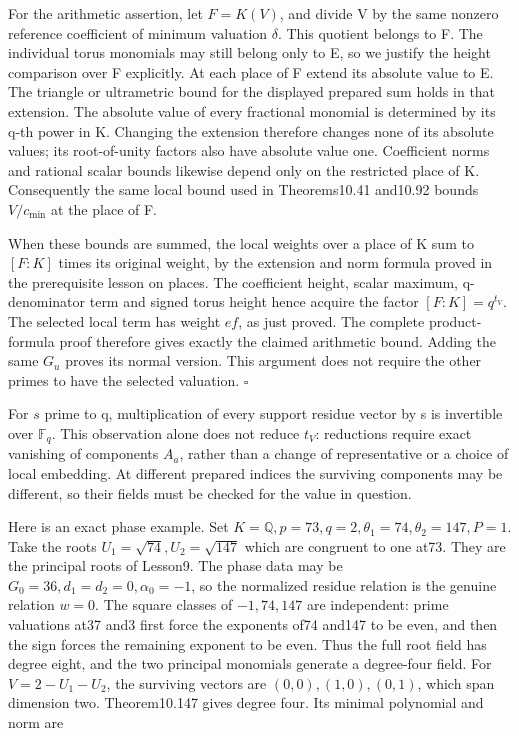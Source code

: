 \documentclass[
  11pt,
  a4paper,
]{article}
\newcounter{none} %
\begin{document}
For the arithmetic assertion, let \(F=K(V)\), and divide V by the same
nonzero reference coefficient of minimum valuation \(\delta\). This
quotient belongs to F. The individual torus monomials may still belong
only to E, so we justify the height comparison over F explicitly. At
each place of F extend its absolute value to E. The triangle or
ultrametric bound for the displayed prepared sum holds in that
extension. The absolute value of every fractional monomial is determined
by its q-th power in K. Changing the extension therefore changes none of
its absolute values; its root-of-unity factors also have absolute value
one. Coefficient norms and rational scalar bounds likewise depend only
on the restricted place of K. Consequently the same local bound used in
Theorems10.41 and10.92 bounds \(V/c_{\min}\) at the place of F.

When these bounds are summed, the local weights over a place of K sum to
\([F:K]\) times its original weight, by the extension and norm formula
proved in the prerequisite lesson on places. The coefficient height,
scalar maximum, q-denominator term and signed torus height hence acquire
the factor \([F:K]=q^{t_V}\). The selected local term has weight \(ef\),
as just proved. The complete product-formula proof therefore gives
exactly the claimed arithmetic bound. Adding the same \(G_u\) proves its
normal version. This argument does not require the other primes to have
the selected valuation. \(\square\)

For \(s\) prime to q, multiplication of every support residue vector by
s is invertible over \(\mathbb F_q\). This observation alone does not
reduce \(t_V\): reductions require exact vanishing of components
\(A_a\), rather than a change of representative or a choice of local
embedding. At different prepared indices the surviving components may be
different, so their fields must be checked for the value in question.

Here is an exact phase example. Set
\(K=\mathbb Q,p=73,q=2,\theta_1=74,\theta_2=147,P=1\). Take the roots
\(U_1=\sqrt{74},U_2=\sqrt{147}\) which are congruent to one at73. They
are the principal roots of Lesson9. The phase data may be
\(G_0=36,d_1=d_2=0,\alpha_0=-1\), so the normalized residue relation is
the genuine relation \(w=0\). The square classes of \(-1,74,147\) are
independent: prime valuations at37 and3 first force the exponents of74
and147 to be even, and then the sign forces the remaining exponent to be
even. Thus the full root field has degree eight, and the two principal
monomials generate a degree-four field. For \(V=2-U_1-U_2\), the
surviving vectors are \((0,0),(1,0),(0,1)\), which span dimension two.
Theorem10.147 gives degree four. Its minimal polynomial and norm are
\end{document}
